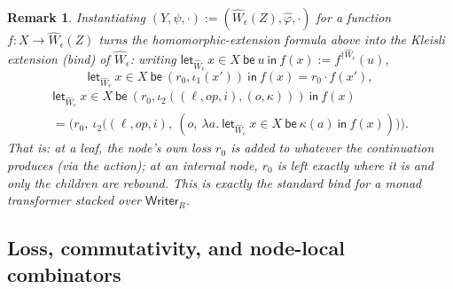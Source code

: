 \documentclass[11pt]{article}
\theoremstyle{plain}
\newtheorem{remark}[theorem]{Remark}
\newcommand{\Wm}[1]{\widehat{W}_{#1}}
\newcommand{\eps}{\epsilon}
\newcommand{\dg}[1]{^{\dagger #1}}
\newcommand{\op}{\mathit{op}}
\begin{document}
\begin{remark}
Instantiating $(Y,\psi,\cdot) := (\Wm\eps(Z),\widehat\varphi,\cdot)$ for a function
$f : X\to \Wm\eps(Z)$ turns the homomorphic-extension formula above into the
\emph{Kleisli extension} (bind) of $\Wm\eps$: writing $\mathsf{let}_{\Wm\eps}\,
x\in X\ \mathsf{be}\ u\ \mathsf{in}\ f(x) := f\dg{\Wm\eps}(u)$,
\[
  \mathsf{let}_{\Wm\eps}\ x\in X\ \mathsf{be}\ (r_0,\iota_1(x'))\ \mathsf{in}\ f(x)
     = r_0\cdot f(x'),
\]
\begin{multline*}
  \mathsf{let}_{\Wm\eps}\ x\in X\ \mathsf{be}\ (r_0,\iota_2((\ell,\op,i),(o,\kappa)))\ \mathsf{in}\ f(x) \\
     = \Big(r_0,\ \iota_2\big((\ell,\op,i),\ (o,\ \lambda a.\ \mathsf{let}_{\Wm\eps}\ x\in X\ \mathsf{be}\ \kappa(a)\ \mathsf{in}\ f(x))\big)\Big).
\end{multline*}
That is: at a leaf, the node's own loss $r_0$ is \emph{added} to whatever the continuation
produces (via the action); at an internal node, $r_0$ is left exactly where it is and only the
children are rebound. This is exactly the standard bind for a monad transformer stacked over
$\mathsf{Writer}_R$.
\end{remark}

\subsection{Loss, commutativity, and node-local combinators}
\end{document}
